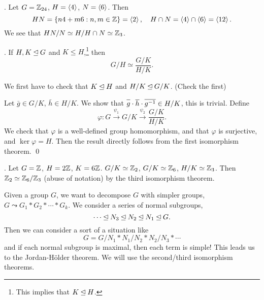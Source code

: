 \ex. Let \(G = \mathbb{Z}_{24}\), \(H = \left\langle 4 \right\rangle\), \(N = \left\langle 6 \right\rangle\). Then
\[
    HN = \{n4 + m6 : n, m \in \mathbb{Z}\} = \left\langle 2 \right\rangle, \quad H\cap N = \left\langle 4 \right\rangle\cap \left\langle 6 \right\rangle = \left\langle 12 \right\rangle.
\]
We see that \(HN / N \simeq H / H\cap N \simeq \mathbb{Z}_3\).

\medskip

\thm.  If \(H, K \unlhd G\) and \(K \leq H\),\footnote{This implies that \(K \unlhd H\).} then
\[
    G / H \simeq \frac{G/K}{H/K}.
\]

\pf We first have to check that \(K \unlhd H\) and \(H/K \unlhd G/K\). (Check the first)

Let \(\bar{g} \in G/K\), \(\bar{h} \in H/K\). We show that \(\bar{g} \cdot \bar{h} \cdot \bar{g\inv} \in H/K\), this is trivial. Define
\[
    \varphi : G \overset{\psi_1}{\longrightarrow} G/K \overset{\psi_2}{\longrightarrow} \frac{G/K}{H/K}.
\]
We check that \(\varphi\) is a well-defined group homomorphism, and that \(\varphi\) is surjective, and \(\ker \varphi = H\). Then the result directly follows from the first isomorphism theorem. \qed

\ex. Let \(G = \mathbb{Z}\), \(H = 2\mathbb{Z}\), \(K = 6\mathbb{Z}\). \(G/K \simeq \mathbb{Z}_2\), \(G/K \simeq \mathbb{Z}_6\), \(H/K \simeq \mathbb{Z}_3\). Then \(\mathbb{Z}_2 \simeq \mathbb{Z}_6 / \mathbb{Z}_3\) (abuse of notation) by the third isomorphism theorem.


Given a group \(G\), we want to decompose \(G\) with simpler groups, \(G \leadsto G_1 * G_2 * \cdots * G_k\). We consider a series of normal subgroups,
\[
    \cdots \unlhd N_3 \unlhd N_2 \unlhd N_1 \unlhd G.
\]
Then we can consider a sort of a situation like
\[
    G = G/N_1 * N_1 / N_2 * N_2 / N_3 * \cdots
\]
and if each normal subgroup is maximal, then each term is simple! This leads us to the Jordan-Hölder theorem. We will use the second/third isomorphism theorems.

\smallskip

